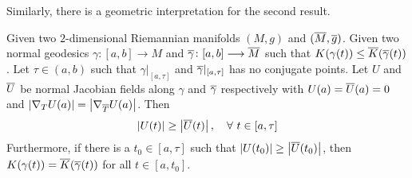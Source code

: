 \begin{enumerate}[label=\arabic{*}.]
	Similarly, there is a geometric interpretation for the second result.
	\begin{thm}
		Given two $2$-dimensional Riemannian manifolds $(M,g)$ and $(\overline{M},\overline{g})$. Given two normal geodesics $\gamma \colon [a,b] \longrightarrow M$ and $\overline{\gamma} \colon [a,b] \longrightarrow \overline{M}$ such that $K(\gamma(t)) \leq \overline{K}(\overline{\gamma}(t))$. Let $\tau \in (a,b)$ such that $\gamma|_{[a,\tau]}$ and $\overline{\gamma}|_{[a,\tau]}$ has no conjugate points. Let $U$ and $\overline{U}$ be normal Jacobian fields along $\gamma$ and $\overline{\gamma}$ respectively with $U(a) = \overline{U}(a) = 0$ and $\left\lvert\nabla_{T}U(a)\right\lvert = \left\lvert\nabla_{\overline{T}}U(a)\right\lvert$. Then
		\begin{equation*}
		 	\left\lvert U(t)\right\lvert \geq \left\lvert\overline{U}(t)\right\lvert,\quad \forall~t \in [a,\tau]
		 \end{equation*} 
		 Furthermore, if there is a $t_0 \in [a,\tau]$ such that $\left\lvert U(t_0)\right\lvert \geq \left\lvert\overline{U}(t_0)\right\lvert$, then $K(\gamma(t)) = \overline{K}(\overline{\gamma}(t))$ for all $t \in [a,t_0]$.
	\end{thm}


\end{enumerate}
